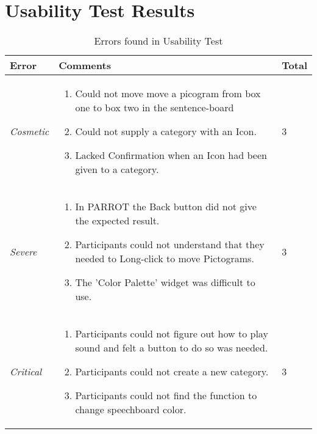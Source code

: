 \section{Usability Test Results}
\label{sec:UseTestRes}

\begin{table}
	\centering
		\begin{tabular}{l | p{5cm} | l}
		\hline
			\textbf{Error} & \textbf{Comments} & Total\\
		\hline
			\textit{Cosmetic} & \begin{enumerate}
														\item Could not move move a picogram from box one to box two in the sentence-board
														\item Could not supply a category with an Icon.
														\item Lacked Confirmation when an Icon had been given to a category.
													\end{enumerate} & 3 \\ 
		\hline
			\textit{Severe} & \begin{enumerate}
													\item In PARROT the Back button did not give the expected result.
													\item Participants could not understand that they needed to Long-click to move Pictograms.
													\item The 'Color Palette' widget was difficult to use.
												\end{enumerate} & 3 \\
		\hline
			\textit{Critical} & \begin{enumerate}
														\item Participants could not figure out how to play sound and felt a button to do so was needed.
														\item Participants could not create a new category.
														\item Participants could not find the function to change speechboard color.
													\end{enumerate} & 3 \\
		\hline
		\end{tabular}
	\caption{Errors found in Usability Test}
	\label{tab:ErrorsFoundInUsabilityTest}
\end{table}